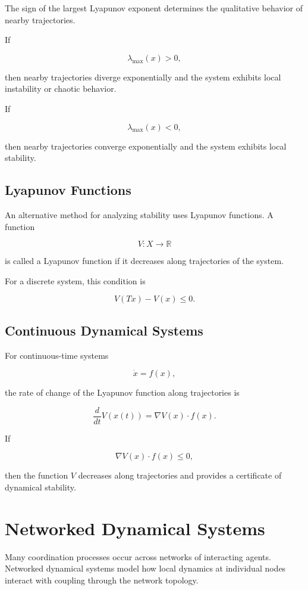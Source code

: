 \documentclass[12pt]{article}
\begin{document}
The sign of the largest Lyapunov exponent determines the qualitative behavior of nearby trajectories.

If

\[
\lambda_{\max}(x) > 0,
\]

then nearby trajectories diverge exponentially and the system exhibits local instability or chaotic behavior.

If

\[
\lambda_{\max}(x) < 0,
\]

then nearby trajectories converge exponentially and the system exhibits local stability.

\subsection{Lyapunov Functions}

An alternative method for analyzing stability uses Lyapunov functions. A function

\[
V : X \rightarrow \mathbb{R}
\]

is called a Lyapunov function if it decreases along trajectories of the system.

For a discrete system, this condition is

\[
V(Tx) - V(x) \le 0.
\]

\subsection{Continuous Dynamical Systems}

For continuous-time systems

\[
\dot{x} = f(x),
\]

the rate of change of the Lyapunov function along trajectories is

\[
\frac{d}{dt}V(x(t)) = \nabla V(x)\cdot f(x).
\]

If

\[
\nabla V(x)\cdot f(x) \le 0,
\]

then the function $V$ decreases along trajectories and provides a certificate of dynamical stability.

\section{Networked Dynamical Systems}

Many coordination processes occur across networks of interacting agents. Networked dynamical systems model how local dynamics at individual nodes interact with coupling through the network topology.
\end{document}
